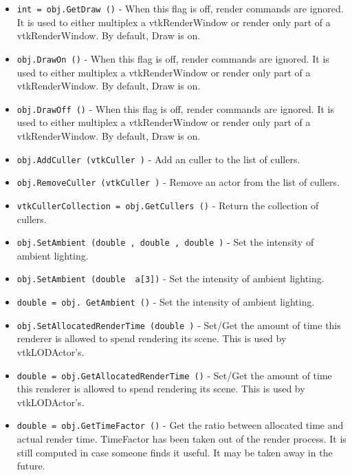 \begin{itemize}
\item  \verb|int = obj.GetDraw ()| -  When this flag is off, render commands are ignored.  It is used to either
 multiplex a vtkRenderWindow or render only part of a vtkRenderWindow.
 By default, Draw is on.

\item  \verb|obj.DrawOn ()| -  When this flag is off, render commands are ignored.  It is used to either
 multiplex a vtkRenderWindow or render only part of a vtkRenderWindow.
 By default, Draw is on.

\item  \verb|obj.DrawOff ()| -  When this flag is off, render commands are ignored.  It is used to either
 multiplex a vtkRenderWindow or render only part of a vtkRenderWindow.
 By default, Draw is on.

\item  \verb|obj.AddCuller (vtkCuller )| -  Add an culler to the list of cullers.

\item  \verb|obj.RemoveCuller (vtkCuller )| -  Remove an actor from the list of cullers.

\item  \verb|vtkCullerCollection = obj.GetCullers ()| -  Return the collection of cullers.

\item  \verb|obj.SetAmbient (double , double , double )| -  Set the intensity of ambient lighting.

\item  \verb|obj.SetAmbient (double  a[3])| -  Set the intensity of ambient lighting.

\item  \verb|double = obj. GetAmbient ()| -  Set the intensity of ambient lighting.

\item  \verb|obj.SetAllocatedRenderTime (double )| -  Set/Get the amount of time this renderer is allowed to spend
 rendering its scene. This is used by vtkLODActor's.

\item  \verb|double = obj.GetAllocatedRenderTime ()| -  Set/Get the amount of time this renderer is allowed to spend
 rendering its scene. This is used by vtkLODActor's.

\item  \verb|double = obj.GetTimeFactor ()| -  Get the ratio between allocated time and actual render time.
 TimeFactor has been taken out of the render process.
 It is still computed in case someone finds it useful.
 It may be taken away in the future.


\end{itemize}

